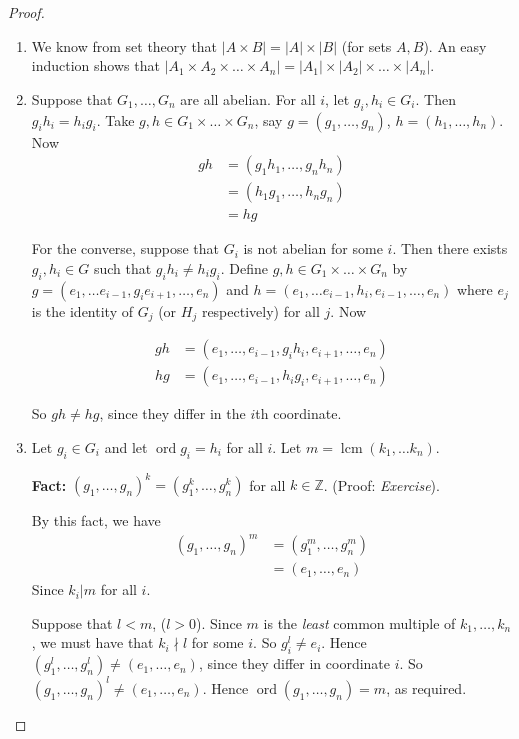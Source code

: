 \documentclass{article}
\theoremstyle{definition}
\newcommand{\integers}{\mathbb{Z}}
\DeclareMathOperator{\lcm}{lcm}
\DeclareMathOperator{\ord}{\text{ord}}
\begin{document}
\begin{proof}\hfill
  \begin{enumerate}
    \item We know from set theory that $|A \times B| = |A| \times |B|$ (for sets $A,B$). An easy induction shows that $|A_1 \times A_2 \times \dots \times A_n| = |A_1| \times |A_2| \times \dots \times |A_n|$.
    \item Suppose that $G_1, \dots , G_n$ are all abelian. For all $i$, let $g_i,h_i\in G_i$. Then $g_ih_i=h_ig_i$. Take $g,h \in G_1 \times \dots \times G_n$, say $g=\left( g_1, \dots , g_n \right)$, $h = \left( h_1, \dots , h_n \right)$. Now
\begin{align*}
  gh &= \left( g_1 h_1, \dots , g_n h_n \right)\\
  &= \left( h_1g_1, \dots , h_n g_n \right)\\
  &= hg
\end{align*}

For the converse, suppose that $G_i$ is not abelian for some $i$. Then there exists $g_i,h_i \in G$ such that $g_ih_i \neq h_ig_i$. Define $g,h \in G_1 \times \dots \times G_n$ by $g = \left( e_1,\dots e_{i-1},g_ie_{i+1},\dots,e_n \right)$ and $h = \left( e_1, \dots e_{i-1},h_i,e_{i-1},\dots,e_n \right)$ where $e_j$ is the identity of $G_j$ (or $H_j$ respectively) for all $j$. Now

\begin{align*}
  gh &= \left( e_1,\dots,e_{i-1},g_ih_i,e_{i+1},\dots,e_n \right)\\
  hg &= \left( e_1,\dots,e_{i-1},h_ig_i,e_{i+1},\dots,e_n \right)
\end{align*}

So $gh \neq hg$, since they differ in the $i$th coordinate.

\item Let $g_i \in G_i$ and let $\ord g_i=h_i$ for all $i$. Let $m=\lcm(k_1,\dots k_n)$.

  \textbf{Fact:} $(g_1, \dots ,g_n)^{k}=(g_1^k,\dots,g_n^k)$ for all $k \in \integers$. (Proof: \emph{Exercise}).

  By this fact, we have 
  \begin{align*}
    \left( g_1, \dots, g_n \right)^m &= \left( g_1^m, \dots,g_n^m \right)\\
    &= \left( e_1, \dots,e_n \right)
  \end{align*}
  Since $k_i | m$ for all $i$.

  Suppose that $l<m$, ($l>0$). Since $m$ is the \emph{least} common multiple of $k_1, \dots, k_n$, we must have that $k_i\nmid l$ for some $i$. So $g_i^l\neq e_i$. Hence $\left( g_1^l,\dots,g_n^l \right) \neq \left( e_1,\dots,e_n \right)$, since they differ in coordinate $i$. So $\left( g_1 ,\dots,g_n \right)^l \neq \left( e_1, \dots,e_n \right)$. Hence $\ord \left( g_1 ,\dots,g_n \right)=m$, as required.
  \end{enumerate}
\end{proof}
\end{document}
